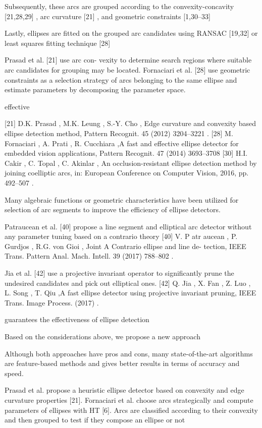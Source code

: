 \documentclass[a4paper]{report}
\begin{document}
Subsequently, these arcs are grouped according to the convexity-concavity [21,28,29] , arc curvature [21] , and geometric constraints [1,30–33] 

Lastly, ellipses are fitted on the grouped arc candidates using RANSAC [19,32] or least squares fitting technique [28]

Prasad et al. [21] use arc con- vexity to determine search regions where suitable arc candidates for grouping may be located. Fornaciari et al. [28] use geometric constraints as a selection strategy of arcs belonging to the same ellipse and estimate parameters by decomposing the parameter space.

effective

[21] D.K. Prasad , M.K. Leung , S.-Y. Cho , Edge curvature and convexity based ellipse detection method, Pattern Recognit. 45 (2012) 3204–3221 .
[28] M. Fornaciari , A. Prati , R. Cucchiara ,A fast and effective ellipse detector for embedded vision applications, Pattern Recognit. 47 (2014) 3693–3708
[30] H.I. Cakir , C. Topal , C. Akinlar , An occlusion-resistant ellipse detection method by joining coelliptic arcs, in: European Conference on Computer Vision, 2016, pp. 492–507 .


Many algebraic functions or geometric characteristics have been utilized for selection of arc segments to improve the efficiency of ellipse detectors.

Patraucean et al. [40] propose a line segment and elliptical arc detector without any parameter tuning based on a contrario theory
[40] V. P atr aucean , P. Gurdjos , R.G. von Gioi , Joint A Contrario ellipse and line de- tection, IEEE Trans. Pattern Anal. Mach. Intell. 39 (2017) 788–802 .

Jia et al. [42] use a projective invariant operator to significantly prune the undesired candidates and pick out elliptical ones. 
[42] Q. Jia , X. Fan , Z. Luo , L. Song , T. Qiu ,A fast ellipse detector using projective invariant pruning, IEEE Trans. Image Process. (2017) .

guarantees the effectiveness of ellipse detection

Based on the considerations above, we propose a new approach



Although both approaches have pros and cons, many state-of-the-art algorithms
are feature-based methods and gives better results in terms of accuracy and
speed.


Prasad et al. propose a heuristic ellipse detector based on convexity and edge curvature properties [21]. Fornaciari et al. choose arcs strategically and compute parameters of ellipses with HT [6]. Arcs are classified according to their convexity and then grouped to test if they compose an ellipse or not
\end{document}
